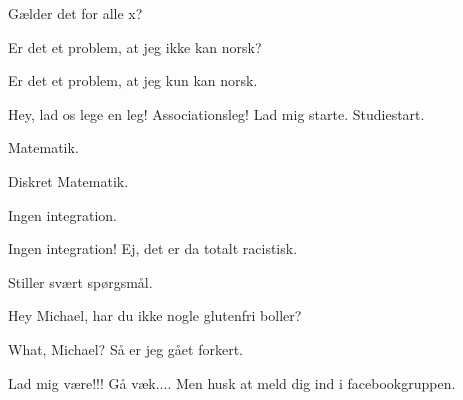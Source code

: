 \documentclass[a4paper,11pt]{article}
\begin{document}
\begin{sketch}
 Gælder det for alle x?

 Er det et problem, at jeg ikke kan norsk?

 Er det et problem, at jeg kun kan norsk.

 Hey, lad os lege en leg! Associationsleg! Lad mig starte. Studiestart.

 Matematik.

 Diskret Matematik.

 Ingen integration.

 Ingen integration! Ej, det er da totalt racistisk.

 Stiller svært spørgsmål.


 Hey Michael, har du ikke nogle glutenfri boller?

 What, Michael? Så er jeg gået forkert.


 Lad mig være!!! Gå væk.... Men husk at meld dig ind i facebookgruppen.

\end{sketch}
\end{document}
